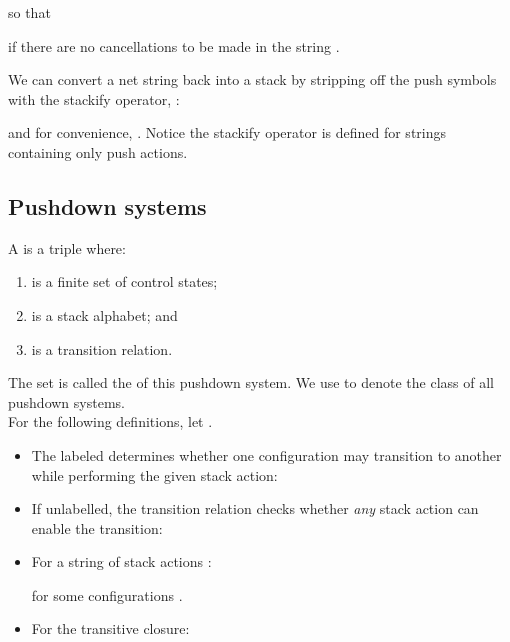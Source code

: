 so that

if there are no cancellations to be made in the string .


We can convert a net string back into a stack by stripping off the
push symbols with the stackify operator, :

and for convenience, .
Notice the stackify operator is defined for strings containing
only push actions. 




  \subsection{Pushdown systems}
  A  is a triple
   where:
  \begin{enumerate}

  \item  is a finite set of control states;

  \item  is a stack alphabet; and

  \item  is a transition relation.
  \end{enumerate}
The set  is 
  called the  of this pushdown system.
We use  to denote the class of all pushdown systems.
  \\

  \noindent
  For the following definitions, let .
  \begin{itemize}



  \item The labeled  
  determines whether one configuration may transition to another while performing the given stack action:
        


\item If unlabelled, the transition relation  checks whether \emph{any} stack action can enable the transition:


\item

For a string of stack actions :

for some configurations .

\item

For the transitive closure:


\end{itemize}




